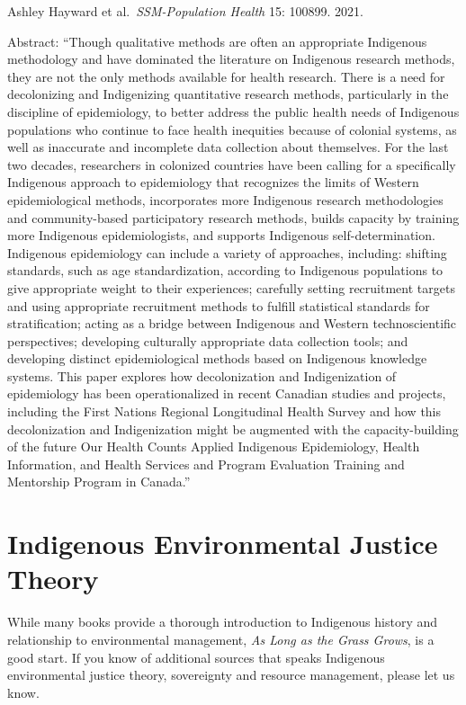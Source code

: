 \documentclass[
]{book}
\begin{document}
Ashley Hayward et al.~\emph{SSM-Population Health} 15: 100899. 2021.

Abstract: ``Though qualitative methods are often an appropriate Indigenous methodology and have dominated the literature on Indigenous research methods, they are not the only methods available for health research. There is a need for decolonizing and Indigenizing quantitative research methods, particularly in the discipline of epidemiology, to better address the public health needs of Indigenous populations who continue to face health inequities because of colonial systems, as well as inaccurate and incomplete data collection about themselves. For the last two decades, researchers in colonized countries have been calling for a specifically Indigenous approach to epidemiology that recognizes the limits of Western epidemiological methods, incorporates more Indigenous research methodologies and community-based participatory research methods, builds capacity by training more Indigenous epidemiologists, and supports Indigenous self-determination. Indigenous epidemiology can include a variety of approaches, including: shifting standards, such as age standardization, according to Indigenous populations to give appropriate weight to their experiences; carefully setting recruitment targets and using appropriate recruitment methods to fulfill statistical standards for stratification; acting as a bridge between Indigenous and Western technoscientific perspectives; developing culturally appropriate data collection tools; and developing distinct epidemiological methods based on Indigenous knowledge systems. This paper explores how decolonization and Indigenization of epidemiology has been operationalized in recent Canadian studies and projects, including the First Nations Regional Longitudinal Health Survey and how this decolonization and Indigenization might be augmented with the capacity-building of the future Our Health Counts Applied Indigenous Epidemiology, Health Information, and Health Services and Program Evaluation Training and Mentorship Program in Canada.''

\hypertarget{indigenous-environmental-justice-theory}{%
\section{Indigenous Environmental Justice Theory}\label{indigenous-environmental-justice-theory}}

While many books provide a thorough introduction to Indigenous history and relationship to environmental management, \emph{As Long as the Grass Grows}, is a good start. If you know of additional sources that speaks Indigenous environmental justice theory, sovereignty and resource management, please let us know.
\end{document}
